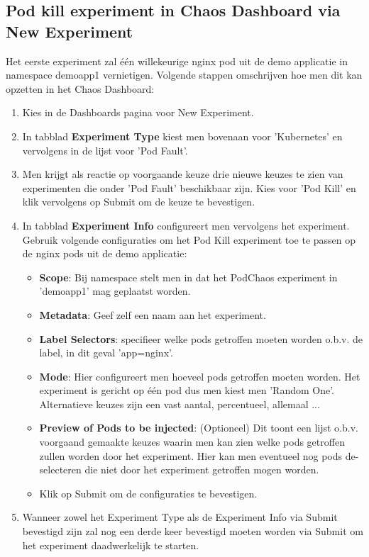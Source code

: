 \subsection{Pod kill experiment in Chaos Dashboard via New Experiment} 

Het eerste experiment zal één willekeurige nginx pod uit de demo applicatie in namespace demoapp1 vernietigen. Volgende stappen omschrijven hoe men dit kan opzetten in het Chaos Dashboard: 
\begin{enumerate}
    \item Kies in de Dashboards pagina voor New Experiment. 
    \item In tabblad {\bf Experiment Type} kiest men bovenaan voor 'Kubernetes' en vervolgens in de lijst voor 'Pod Fault'. 
    \item Men krijgt als reactie op voorgaande keuze drie nieuwe keuzes te zien van experimenten die onder 'Pod Fault' beschikbaar zijn. Kies voor 'Pod Kill' en klik vervolgens op Submit om de keuze te bevestigen.
    \item In tabblad {\bf Experiment Info} configureert men vervolgens het experiment. Gebruik volgende configuraties om het Pod Kill experiment toe te passen op de nginx pods uit de demo applicatie:
        \begin{itemize}
            \item {\bf Scope}: Bij namespace stelt men in dat het PodChaos experiment in 'demoapp1' mag geplaatst worden.
            \item {\bf Metadata}: Geef zelf een naam aan het experiment.
            \item {\bf Label Selectors}: specifieer welke pods getroffen moeten worden o.b.v. de label, in dit geval 'app=nginx'.
            \item {\bf Mode}: Hier configureert men hoeveel pods getroffen moeten worden. Het experiment is gericht op één pod dus men kiest men 'Random One'. Alternatieve keuzes zijn een vast aantal, percentueel, allemaal ...
            \item {\bf Preview of Pods to be injected}: (Optioneel) Dit toont een lijst o.b.v. voorgaand gemaakte keuzes waarin men kan zien welke pods getroffen zullen worden door het experiment. Hier kan men eventueel nog pods de-selecteren die niet door het experiment getroffen mogen worden.
            \item Klik op Submit om de configuraties te bevestigen.
        \end{itemize}
    \item Wanneer zowel het Experiment Type als de Experiment Info via Submit bevestigd zijn zal nog een derde keer bevestigd moeten worden via Submit om het experiment daadwerkelijk te starten.
\end{enumerate}


